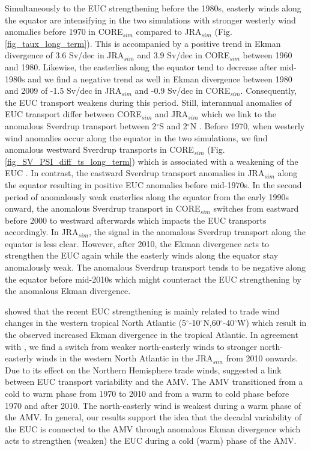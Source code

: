 \documentclass[os, manuscript]{copernicus}
\begin{document}
	Simultaneously to the EUC strengthening before the 1980s, easterly winds along the equator are intensifying in the two simulations with stronger westerly wind anomalies before 1970 in CORE$_{sim}$ compared to JRA$_{sim}$ (Fig. \ref{fig_taux_long_term}). This is accompanied by a positive trend in Ekman divergence of 3.6 Sv/dec in JRA$_{sim}$ and 3.9 Sv/dec in CORE$_{sim}$ between 1960 and 1980. Likewise, the easterlies along the equator tend to decrease after mid-1980s and we find a negative trend as well in Ekman divergence between 1980 and 2009 of -1.5 Sv/dec in JRA$_{sim}$ and -0.9 Sv/dec in CORE$_{sim}$. Consequently, the EUC transport weakens during this period. Still, interannual anomalies of EUC transport differ between CORE$_{sim}$ and JRA$_{sim}$ which we link to the anomalous Sverdrup transport between 2$^{\circ}$S and 2$^{\circ}$N \citep{Arhan2006}. Before 1970, when westerly wind anomalies occur along the equator in the two simulations, we find anomalous westward Sverdrup transports in CORE$_{sim}$ (Fig. \ref{fig_SV_PSI_diff_ts_long_term}) which is associated with a weakening of the EUC \citep{Kessler2003a,Arhan2006,Brandt2014}. In contrast, the eastward Sverdrup transport anomalies in JRA$_{sim}$ along the equator resulting in positive EUC anomalies before mid-1970s. In the second period of anomalously weak easterlies along the equator from the early 1990s onward, the anomalous Sverdrup transport in CORE$_{sim}$ switches from eastward before 2000 to westward afterwards which impacts the EUC transports accordingly. In JRA$_{sim}$, the signal in the anomalous Sverdrup transport along the equator is less clear. However, after 2010, the Ekman divergence acts to strengthen the EUC again while the easterly winds along the equator stay anomalously weak. The anomalous Sverdrup transport tends to be negative along the equator before mid-2010s which might counteract the EUC strengthening by the anomalous Ekman divergence.  
	
	\citet{Brandt2021a} showed that the recent EUC strengthening is mainly related to trade wind changes in the western tropical North Atlantic (5$^{\circ}$-10$^{\circ}$N,60$^{\circ}$-40$^{\circ}$W) which result in the observed increased Ekman divergence in the tropical Atlantic. In agreement with \citet{Brandt2021a}, we find a switch from weaker north-easterly winds to stronger north-easterly winds in the western North Atlantic in the JRA$_{sim}$ from 2010 onwards. Due to its effect on the Northern Hemisphere trade winds, \cite{Brandt2021a} suggested a link between EUC transport variability and the AMV. The AMV transitioned from a cold to warm phase from 1970 to 2010 and from a warm to cold phase before 1970 and after 2010. The north-easterly wind is weakest during a warm phase of the AMV. In general, our results support the idea that the decadal variability of the EUC is connected to the AMV through anomalous Ekman divergence which acts to strengthen (weaken) the EUC during a cold (warm) phase of the AMV.
	
\end{document}
